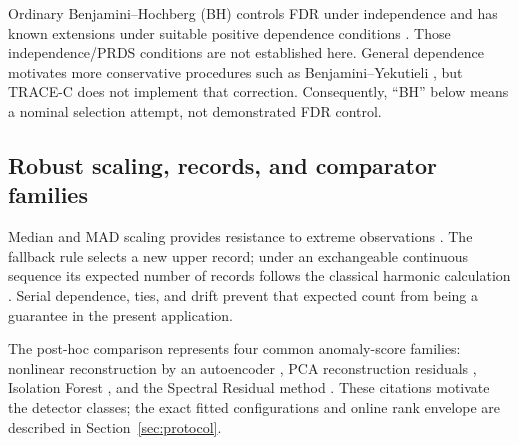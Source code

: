 Ordinary Benjamini--Hochberg (BH) controls FDR under independence and has known
extensions under suitable positive dependence conditions
\citep{benjamini1995fdr}. Those independence/PRDS conditions are not
established here. General dependence motivates more conservative procedures
such as Benjamini--Yekutieli \citep{benjamini2001dependency}, but TRACE-C does
not implement that correction. Consequently, ``BH'' below means a nominal
selection attempt, not demonstrated FDR control.

\subsection{Robust scaling, records, and comparator families}

Median and MAD scaling provides resistance to extreme observations
\citep{rousseeuw1993mad}. The fallback rule selects a new upper record; under an
exchangeable continuous sequence its expected number of records follows the
classical harmonic calculation \citep{renyi1962records}. Serial dependence,
ties, and drift prevent that expected count from being a guarantee in the
present application.

The post-hoc comparison represents four common anomaly-score families:
nonlinear reconstruction by an autoencoder
\citep{sakurada2014autoencoders,vijay2020kerasautoencoder}, PCA reconstruction
residuals \citep{jackson1979pcaresiduals}, Isolation Forest
\citep{liu2008isolationforest}, and the Spectral Residual method
\citep{ren2019spectralresidual}. These citations motivate the detector classes;
the exact fitted configurations and online rank envelope are described in
Section~\ref{sec:protocol}.
